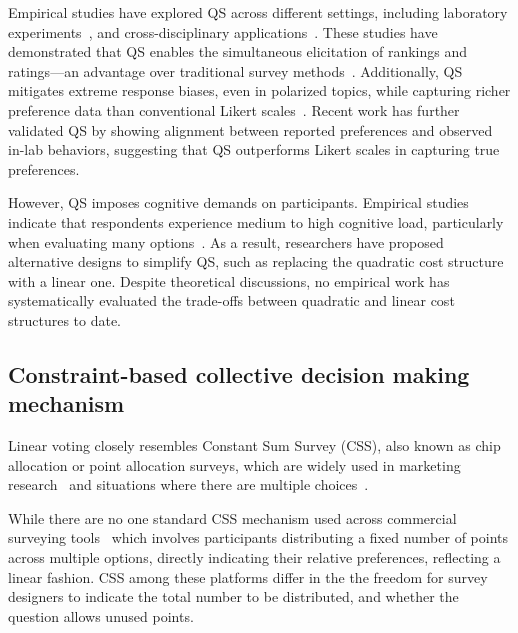 Empirical studies have explored QS across different settings, including laboratory experiments~\cite{chengCanShowWhat2021,quarfoot2017quadratic}, and cross-disciplinary applications~\cite{cavaille2024cares, hollandDistributiveImpactsSupport2022,naylor2017first}. These studies have demonstrated that QS enables the simultaneous elicitation of rankings and ratings---an advantage over traditional survey methods~\cite{chengCanShowWhat2021}. Additionally, QS mitigates extreme response biases, even in polarized topics, while capturing richer preference data than conventional Likert scales~\cite{quarfoot2017quadratic, cavaille2024cares, chengCanShowWhat2021, naylor2017first}. Recent work has further validated QS by showing alignment between reported preferences and observed in-lab behaviors, suggesting that QS outperforms Likert scales in capturing true preferences.

However, QS imposes cognitive demands on participants. Empirical studies indicate that respondents experience medium to high cognitive load, particularly when evaluating many options~\cite{cavaille2024cares, chengCanShowWhat2021}. As a result, researchers have proposed alternative designs to simplify QS, such as replacing the quadratic cost structure with a linear one. Despite theoretical discussions, no empirical work has systematically evaluated the trade-offs between quadratic and linear cost structures to date.

\subsection{Constraint-based collective decision making mechanism}
\label{sec:related_works_css}
Linear voting closely resembles Constant Sum Survey (CSS), also known as chip allocation or point allocation surveys, which are widely used in marketing research~\cite{Malhotra_Naresh_K_2012, smithBasicMarketingResearch2013, Donald_R_Cooper2013-03-05, toepoelSmileysStarsHearts2019, hauserIntensityMeasuresConsumer1980} and situations where there are multiple choices~\cite{zhuSelfestimationWeightParameter1991, harwoodUnderstandingImplicitExplicit2019, hanPatientsPerspectivePsychiatric2024}.

While there are no one standard CSS mechanism used across commercial surveying tools~\cite{qualtricsConstantSumQuestion2025, surveysparrowWhatConstantSum2025, lorraineConstantSumQuestion2022} which involves participants distributing a fixed number of points across multiple options, directly indicating their relative preferences, reflecting a linear fashion. CSS among these platforms differ in the the freedom for survey designers to indicate the total number to be distributed, and whether the question allows unused points.

